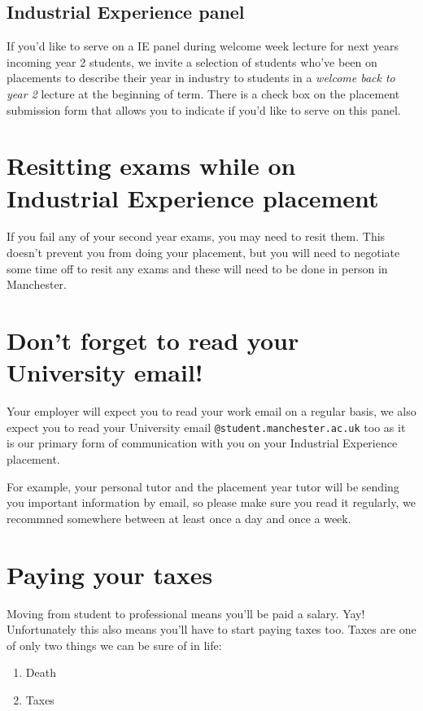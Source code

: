 \documentclass[
]{book}
\providecommand{\tightlist}{%
  \setlength{\itemsep}{0pt}\setlength{\parskip}{0pt}}
\begin{document}
\subsection{Industrial Experience panel}\label{six}

If you'd like to serve on a IE panel during welcome week lecture for next years incoming year 2 students, we invite a selection of students who've been on placements to describe their year in industry to students in a \emph{welcome back to year 2} lecture at the beginning of term. There is a check box on the placement submission form that allows you to indicate if you'd like to serve on this panel.

\section{Resitting exams while on Industrial Experience placement}\label{resits}

If you fail any of your second year exams, you may need to resit them. This doesn't prevent you from doing your placement, but you will need to negotiate some time off to resit any exams and these will need to be done in person in Manchester. \citep{resits}

\section{Don't forget to read your University email!}\label{email}

Your employer will expect you to read your work email on a regular basis, we also expect you to read your University email \texttt{@student.manchester.ac.uk} too as it is our primary form of communication with you on your Industrial Experience placement.

For example, your personal tutor and the placement year tutor will be sending you important information by email, so please make sure you read it regularly, we recommned somewhere between at least once a day and once a week.

\section{Paying your taxes}\label{taxes}

Moving from student to professional means you'll be paid a salary. Yay! Unfortunately this also means you'll have to start paying taxes too. Taxes are one of only two things we can be sure of in life:

\begin{enumerate}
\def\labelenumi{\arabic{enumi}.}
\tightlist
\item
  Death \citep{death}
\item
  Taxes \citep{death}
\end{enumerate}
\end{document}
